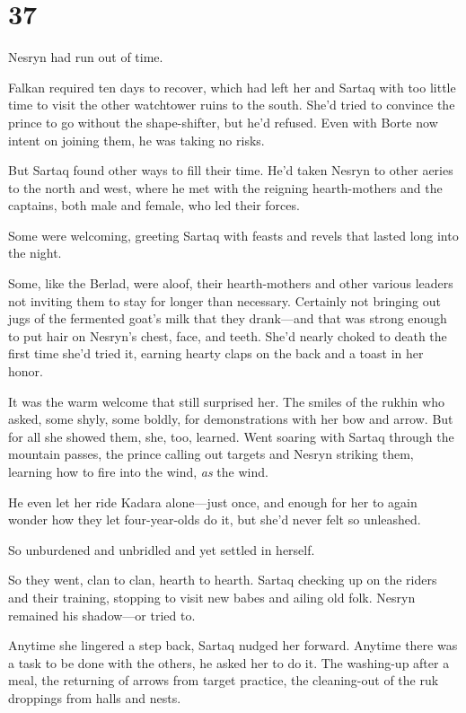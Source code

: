 
\chapter{37}

Nesryn had run out of time.

Falkan required ten days to recover, which had left her and Sartaq with too little time to visit the other watchtower ruins to the south. She'd tried to convince the prince to go without the shape-shifter, but he'd refused. Even with Borte now intent on joining them, he was taking no risks.

But Sartaq found other ways to fill their time. He'd taken Nesryn to other aeries to the north and west, where he met with the reigning hearth-mothers and the captains, both male and female, who led their forces.

Some were welcoming, greeting Sartaq with feasts and revels that lasted long into the night.

Some, like the Berlad, were aloof, their hearth-mothers and other various leaders not inviting them to stay for longer than necessary. Certainly not bringing out jugs of the fermented goat's milk that they drank---and that was strong enough to put hair on Nesryn's chest, face, and teeth. She'd nearly choked to death the first time she'd tried it, earning hearty claps on the back and a toast in her honor.

It was the warm welcome that still surprised her. The smiles of the rukhin who asked, some shyly, some boldly, for demonstrations with her bow and arrow. But for all she showed them, she, too, learned. Went soaring with Sartaq through the mountain passes, the prince calling out targets and Nesryn striking them, learning how to fire into the wind,
\emph{as} the wind.

He even let her ride Kadara alone---just once, and enough for her to again wonder how they let four-year-olds do it, but  she'd never felt so unleashed.

So unburdened and unbridled and yet settled in herself.

So they went, clan to clan, hearth to hearth. Sartaq checking up on the riders and their training, stopping to visit new babes and ailing old folk. Nesryn remained his shadow---or tried to.

Anytime she lingered a step back, Sartaq nudged her forward. Anytime there was a task to be done with the others, he asked her to do it. The washing-up after a meal, the returning of arrows from target practice, the cleaning-out of the ruk droppings from halls and nests.

